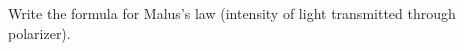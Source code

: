 

\vspace*{\fill}
\centering

Write the formula for Malus's law (intensity of light transmitted through polarizer).

\centering
\vspace*{\fill}

